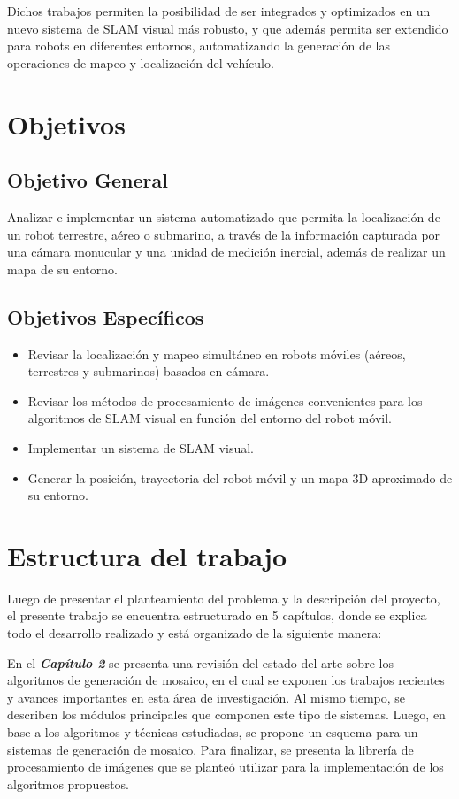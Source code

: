 Dichos trabajos permiten la posibilidad de ser integrados  y optimizados en un nuevo sistema de SLAM visual más robusto, y que además permita ser extendido para robots en diferentes entornos, automatizando la generación de las operaciones de mapeo y localización del vehículo.

\section{Objetivos}

\subsection{Objetivo General}

Analizar e implementar un sistema automatizado que permita la localización de un robot terrestre, aéreo o submarino, a través de la información capturada por una cámara monucular y una unidad de medición inercial, además de realizar un mapa de su entorno.

\subsection{Objetivos Específicos}

\begin{itemize}
	\item  Revisar la localización y mapeo simultáneo en robots móviles (aéreos, terrestres y submarinos) basados en cámara.
	\item Revisar los métodos de procesamiento de imágenes convenientes para los algoritmos de SLAM visual en función del entorno del robot móvil.
	\item Implementar un sistema de SLAM visual.
	\item Generar la posición, trayectoria del robot móvil y  un mapa 3D aproximado de su entorno.
\end{itemize}

\section{Estructura del trabajo}

Luego de presentar el planteamiento del problema y la descripción del proyecto, el presente trabajo se encuentra estructurado en 5 capítulos, donde se explica todo el desarrollo realizado y está organizado de la siguiente manera:

En el \textit{\textbf{Capítulo 2}} se presenta una revisión del estado del arte sobre los algoritmos de generación de mosaico, en el cual se exponen los trabajos recientes y avances importantes en esta área de investigación. Al mismo tiempo, se describen los módulos principales que componen este tipo de sistemas. Luego, en base a los algoritmos y técnicas estudiadas, se propone un esquema para un sistemas de generación de mosaico. Para finalizar, se presenta la librería de procesamiento de imágenes que se planteó utilizar para la implementación de los algoritmos propuestos.

